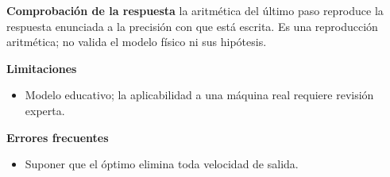\documentclass[10pt,openany]{book}
\begin{document}
\begin{tcolorbox}[title={Problema resuelto 2}, studiumworked, breakable]
\noindent\textbf{Comprobación de la respuesta} la aritmética del último paso reproduce la respuesta enunciada a la precisión con que está escrita. Es una reproducción aritmética; no valida el modelo físico ni sus hipótesis.

\noindent\textbf{Limitaciones}
\begin{itemize}
\item Modelo educativo; la aplicabilidad a una máquina real requiere revisión experta.
\end{itemize}

\noindent\textbf{Errores frecuentes}
\begin{itemize}
\item Suponer que el óptimo elimina toda velocidad de salida.
\end{itemize}
\end{tcolorbox}
\end{document}
